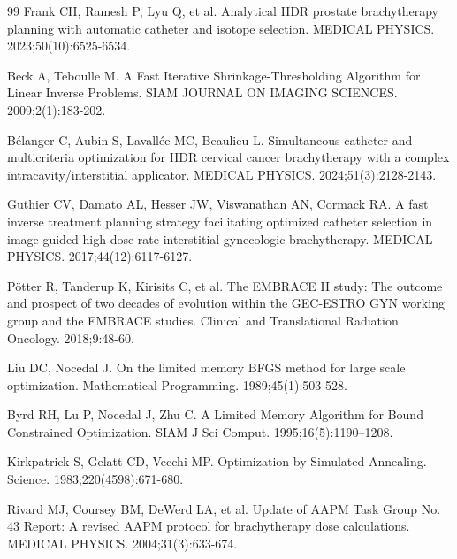 \documentclass[12pt,twoside,letterpaper]{article}
\begin{document}
\begin{thebibliography}{99}
 Frank CH, Ramesh P, Lyu Q, et al. Analytical HDR prostate brachytherapy planning with automatic catheter and isotope selection. MEDICAL PHYSICS. 2023;50(10):6525-6534.

 Beck A, Teboulle M. A Fast Iterative Shrinkage-Thresholding Algorithm for Linear Inverse Problems. SIAM JOURNAL ON IMAGING SCIENCES. 2009;2(1):183-202.

 Bélanger C, Aubin S, Lavallée MC, Beaulieu L. Simultaneous catheter and multicriteria optimization for HDR cervical cancer brachytherapy with a complex intracavity/interstitial applicator. MEDICAL PHYSICS. 2024;51(3):2128-2143.

 Guthier CV, Damato AL, Hesser JW, Viswanathan AN, Cormack RA. A fast inverse treatment planning strategy facilitating optimized catheter selection in image-guided high-dose-rate interstitial gynecologic brachytherapy. MEDICAL PHYSICS. 2017;44(12):6117-6127.

 Pötter R, Tanderup K, Kirisits C, et al. The EMBRACE II study: The outcome and prospect of two decades of evolution within the GEC-ESTRO GYN working group and the EMBRACE studies. Clinical and Translational Radiation Oncology. 2018;9:48-60.

 Liu DC, Nocedal J. On the limited memory BFGS method for large scale optimization. Mathematical Programming. 1989;45(1):503-528.

 Byrd RH, Lu P, Nocedal J, Zhu C. A Limited Memory Algorithm for Bound Constrained Optimization. SIAM J Sci Comput. 1995;16(5):1190--1208.

 Kirkpatrick S, Gelatt CD, Vecchi MP. Optimization by Simulated Annealing. Science. 1983;220(4598):671-680.

 Rivard MJ, Coursey BM, DeWerd LA, et al. Update of AAPM Task Group No. 43 Report: A revised AAPM protocol for brachytherapy dose calculations. MEDICAL PHYSICS. 2004;31(3):633-674.

\end{thebibliography}

\endgroup
\end{document}
